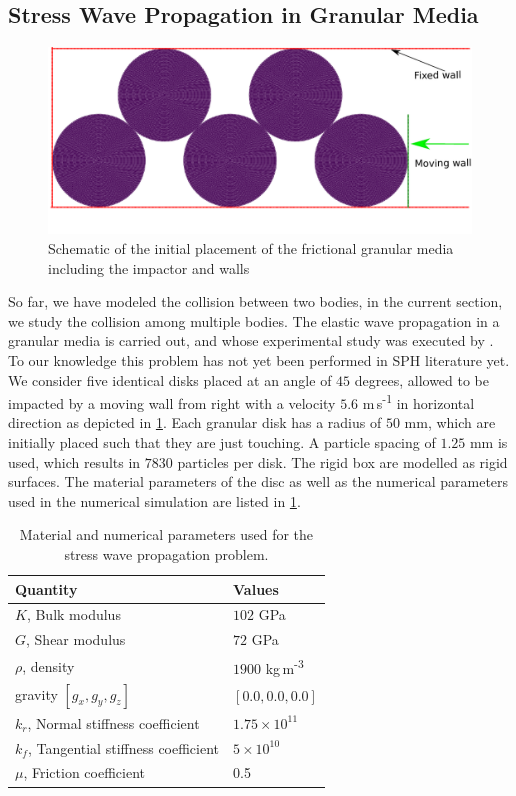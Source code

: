 \subsection{Stress Wave Propagation in Granular Media}
\label{sec:results-stress-wave-propagation-with-friction}
\begin{figure}[!htpb]
  \centering
  \includegraphics[width=1.0\textwidth]{images/csph/images/de_2021_stress_wave_in_granular_material_part_2/schematic}
  \caption{Schematic of the initial placement of the frictional granular media including the impactor and walls}
\label{fig:results-stress-wave-propagation-part-II}
\end{figure}
So far, we have modeled the collision between two bodies, in the current
section, we study the collision among multiple bodies. The elastic wave
propagation in a granular media is carried out, and whose experimental study was
executed by \textcite{guilkey2001improved}. To our knowledge this problem has not
yet been performed in SPH literature yet. We consider five identical disks
placed at an angle of $45$ degrees, allowed to be impacted by a moving wall from
right with a velocity $5.6$ m\,s\textsuperscript{-1} in horizontal direction as
depicted in \cref{fig:results-stress-wave-propagation-part-II}. Each granular
disk has a radius of $50$ mm, which are initially placed such that they are just
touching. A particle spacing of $1.25$ mm is used, which results in $7830$
particles per disk. The rigid box are modelled as rigid surfaces. The material
parameters of the disc as well as the numerical parameters used in the numerical
simulation are listed in \cref{tab:de-stress-part-2-params}.
\begin{table}[!ht]
  \centering
  \begin{tabular}[!ht]{ll}
    \toprule
    Quantity & Values\\
    \midrule
    $K$, Bulk modulus & $102$ GPa \\
    $G$, Shear modulus & $72$ GPa \\
    $\rho$, density & $1900$ kg\,m\textsuperscript{-3} \\
    gravity $[g_x, g_y, g_z]$ & $[0.0, 0.0, 0.0]$\\
    $k_r$, Normal stiffness coefficient & $1.75 \times 10^{11}$ \\
    $k_f$, Tangential stiffness coefficient & $5 \times 10^{10}$ \\
    $\mu$, Friction coefficient & 0.5 \\
    \bottomrule
  \end{tabular}
  \caption{Material and numerical parameters used for the stress wave propagation problem.}%
  \label{tab:de-stress-part-2-params}
\end{table}
